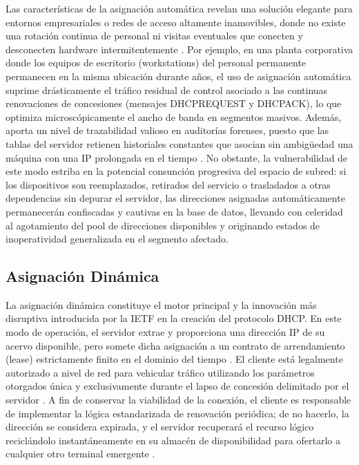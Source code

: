 \documentclass[a4paper,12pt]{article}
\begin{document}
Las características de la asignación automática revelan una solución elegante para entornos empresariales o redes de acceso altamente inamovibles, donde no existe una rotación continua de personal ni visitas eventuales que conecten y desconecten hardware intermitentemente \cite{ionos_dhcp_config}. Por ejemplo, en una planta corporativa donde los equipos de escritorio (workstations) del personal permanente permanecen en la misma ubicación durante años, el uso de asignación automática suprime drásticamente el tráfico residual de control asociado a las continuas renovaciones de concesiones (mensajes DHCPREQUEST y DHCPACK), lo que optimiza microscópicamente el ancho de banda en segmentos masivos. Además, aporta un nivel de trazabilidad valioso en auditorías forenses, puesto que las tablas del servidor retienen historiales constantes que asocian sin ambigüedad una máquina con una IP prolongada en el tiempo \cite{rfc2131, wikipedia_dhcp}. No obstante, la vulnerabilidad de este modo estriba en la potencial consunción progresiva del espacio de subred: si los dispositivos son reemplazados, retirados del servicio o trasladados a otras dependencias sin depurar el servidor, las direcciones asignadas automáticamente permanecerán confiscadas y cautivas en la base de datos, llevando con celeridad al agotamiento del pool de direcciones disponibles y originando estados de inoperatividad generalizada en el segmento afectado.

\subsection*{Asignación Dinámica}
La asignación dinámica constituye el motor principal y la innovación más disruptiva introducida por la IETF en la creación del protocolo DHCP. En este modo de operación, el servidor extrae y proporciona una dirección IP de su acervo disponible, pero somete dicha asignación a un contrato de arrendamiento (lease) estrictamente finito en el dominio del tiempo \cite{rfc2131, tcpipguide_dhcp, cisco_dhcp}. El cliente está legalmente autorizado a nivel de red para vehicular tráfico utilizando los parámetros otorgados única y exclusivamente durante el lapso de concesión delimitado por el servidor \cite{cisco_dhcp}. A fin de conservar la viabilidad de la conexión, el cliente es responsable de implementar la lógica estandarizada de renovación periódica; de no hacerlo, la dirección se considera expirada, y el servidor recuperará el recurso lógico reciclándolo instantáneamente en su almacén de disponibilidad para ofertarlo a cualquier otro terminal emergente \cite{rfc2131, manageengine_dhcp_lease}.
\end{document}
